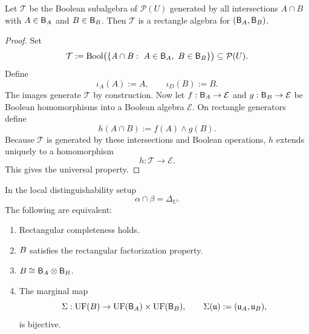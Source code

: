 \begin{proposition}
	\label{prop:tensor-exists}
	Let \(\mathcal T\) be the Boolean subalgebra of \(\mathcal P(U)\)
	generated by all intersections \(A\cap B\) with \(A\in\mathsf B_A\) and
	\(B\in\mathsf B_B\). Then \(\mathcal T\) is a rectangle algebra for
	\((\mathsf B_A,\mathsf B_B)\).
\end{proposition}
\begin{proof}
	Set
	\[
		\mathcal T:=\operatorname{Bool}\bigl(\{A\cap B:\ A\in\mathsf B_A,\ B\in\mathsf B_B\}\bigr)
		\subseteq\mathcal P(U).
	\]
	Define
	\[
		\iota_A(A):=A,
		\qquad
		\iota_D(B):=B.
	\]
	The images generate \(\mathcal T\) by construction.
	Now let \(f:\mathsf B_A\to\mathcal E\) and \(g:\mathsf B_B\to\mathcal E\) be Boolean
	homomorphisms into a Boolean algebra \(\mathcal E\). On rectangle
	generators define
	\[
		h(A\cap B):=f(A)\wedge g(B).
	\]
	Because \(\mathcal T\) is generated by these intersections and Boolean
	operations, \(h\) extends uniquely to a homomorphism
	\[
		h:\mathcal T\to\mathcal E.
	\]
	This gives the universal property.
\end{proof}
\begin{theorem}
	\label{thm:ultrafilter-splitting}
	In the local distinguishability setup
	\[
		\alpha\cap\beta=\Delta_U.
	\]
	The following are equivalent:
	\begin{enumerate}
		\item[\emph{(a)}] Rectangular completeness holds.
		\item[\emph{(b)}] \(B\) satisfies the rectangular factorization property.
		\item[\emph{(c)}] \(B\cong\mathsf B_A\otimes\mathsf B_B\).
		\item[\emph{(d)}] The marginal map
		      \[
			      \Sigma:\operatorname{UF}(B)\to\operatorname{UF}(\mathsf B_A)\times\operatorname{UF}(\mathsf B_B),
			      \qquad
			      \Sigma(\mathfrak u):=(\mathfrak u_A,\mathfrak u_B),
		      \]
		      is bijective.
	\end{enumerate}
\end{theorem}

